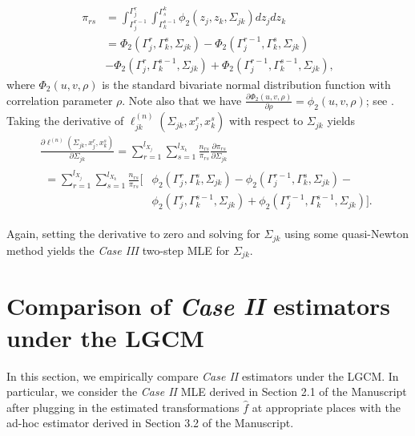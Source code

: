 \begin{equation}
    \begin{split}
        \pi_{rs} &= \int_{{\Gamma}_j^{r-1}}^{{\Gamma}_j^{r}} \int_{{\Gamma}_k^{s-1}}^{{\Gamma}^k_{s}} \phi_2(z_j,z_k,\Sigma_{jk}) dz_j dz_k \\
        &= \Phi_2({\Gamma}_j^r, {\Gamma}_k^s, \Sigma_{jk}) - \Phi_2({\Gamma}_j^{r-1}, {\Gamma}_k^s, \Sigma_{jk}) \\
        &- \Phi_2({\Gamma}_j^r, {\Gamma}_k^{s-1}, \Sigma_{jk}) + \Phi_2({\Gamma}_j^{r-1}, {\Gamma}_k^{s-1}, \Sigma_{jk}),
    \end{split}
\end{equation}
where $\Phi_2(u,v,\rho)$ is the standard bivariate normal distribution function with correlation parameter $\rho$. Note also that we have $\frac{\partial \Phi_2(u,v, \rho)}{\partial \rho} = \phi_2(u,v, \rho)$; see \citep{Tallis62}. Taking the derivative of $\ell_{jk}^{(n)}(\Sigma_{jk}, x_j^r,x_k^s)$ with respect to $\Sigma_{jk}$ yields
\begin{multline*}
    \frac{\partial \ell^{(n)}(\Sigma_{jk}, x_j^r,x_k^s)}{\partial \Sigma_{jk}} = \sum_{r=1}^{l_{X_{j}}}\sum_{s=1}^{l_{X_{k}}} \frac{n_{rs}}{\pi_{rs}} \frac{\partial \pi_{rs}}{\partial \Sigma_{jk}} \\
    \begin{aligned}
        = \sum_{r=1}^{l_{X_{j}}}\sum_{s=1}^{l_{X_{k}}} \frac{n_{rs}}{\pi_{rs}} \Big[ & \phi_2({\Gamma}_j^r, {\Gamma}_k^s, \Sigma_{jk}) - \phi_2({\Gamma}_j^{r-1}, {\Gamma}_k^s, \Sigma_{jk}) -             \\
                                                                                     & \phi_2({\Gamma}_j^r, {\Gamma}_k^{s-1}, \Sigma_{jk}) + \phi_2({\Gamma}_j^{r-1}, {\Gamma}_k^{s-1}, \Sigma_{jk})\Big].
    \end{aligned}
\end{multline*}

Again, setting the derivative to zero and solving for $\Sigma_{jk}$ using some quasi-Newton method yields the \textit{Case III} two-step MLE for $\Sigma_{jk}$.

\section{Comparison of \textit{Case II} estimators under the LGCM}

In this section, we empirically compare \textit{Case II} estimators under the LGCM. In particular, we consider the \textit{Case II} MLE derived in Section 2.1 of the Manuscript after plugging in the estimated transformations \(\hat{f}\) at appropriate places with the ad-hoc estimator derived in Section 3.2 of the Manuscript.



